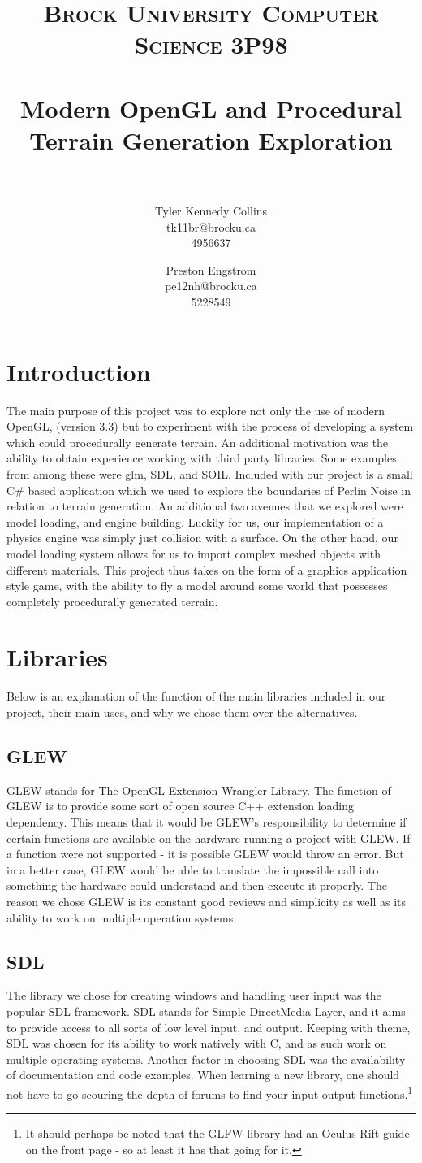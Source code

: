 \documentclass[paper=a4, fontsize=11pt]{scrartcl}
\title{
		\usefont{OT1}{bch}{b}{n}
		\normalfont \normalsize \textsc{Brock University Computer Science 3P98} \\ [25pt]
		\horrule{0.5pt} \\[0.4cm]
		\huge Modern OpenGL and Procedural Terrain Generation Exploration \\
		\horrule{2pt} \\[0.5cm]
}
\author{
		\normalfont 								\normalsize
        Tyler Kennedy Collins\\[-3pt]				\normalsize
        tk11br@brocku.ca\\[-3pt]					\normalsize
        4956637\\									\normalsize
        \and
        Preston Engstrom\\[-3pt]					\normalsize
        pe12nh@brocku.ca\\[-3pt]					\normalsize
        5228549\\									\normalsize
}
\date{}
\numberwithin{equation}{section}		%
\numberwithin{figure}{section}			%
\numberwithin{table}{section}				%
\begin{document}
\maketitle
\section{Introduction}
The main purpose of this project was to explore not only the use of modern OpenGL, (version 3.3) but to experiment with the process of developing a system which could procedurally generate terrain. An additional motivation was the ability to obtain experience working with third party libraries. Some examples from among these were glm, SDL, and SOIL. Included with our project is a small C\# based application which we used to explore the boundaries of Perlin Noise in relation to terrain generation. An additional two avenues that we explored were model loading, and engine building. Luckily for us, our implementation of a physics engine was simply just collision with a surface. On the other hand, our model loading system allows for us to import complex meshed objects with different materials. This project thus takes on the form of a graphics application style game, with the ability to fly a model around some world that possesses completely procedurally generated terrain.

\section{Libraries}
Below is an explanation of the function of the main libraries included in our project, their main uses, and why we chose them over the alternatives.
\subsection{GLEW}
GLEW stands for The OpenGL Extension Wrangler Library. The function of GLEW is to provide some sort of open source C++ extension loading dependency. This means that it would be GLEW's responsibility to determine if certain functions are available on the hardware running a project with GLEW. If a function were not supported - it is possible GLEW would throw an error. But in a better case, GLEW would be able to translate the impossible call into something the hardware could understand and then execute it properly. The reason we chose GLEW is its constant good reviews and simplicity as well as its ability to work on multiple operation systems.
\subsection{SDL}
The library we chose for creating windows and handling user input was the popular SDL framework. SDL stands for Simple DirectMedia Layer, and it aims to provide access to all sorts of low level input, and output. Keeping with theme, SDL was chosen for its ability to work natively with C, and as such work on multiple operating systems. Another factor in choosing SDL was the availability of documentation and code examples. When learning a new library, one should not have to go scouring the depth of forums to find your input output functions.\footnote{It should perhaps be noted that the GLFW library had an Oculus Rift guide on the front page - so at least it has that going for it.}
\end{document}
